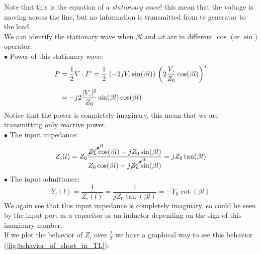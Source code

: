 Note that this is the equation of a \emph{stationary wave}! this mean that the voltage is moving across the line, but no information is transmitted from te generator to the load.\\
We can identify the stationary wave when $\beta l$ and $\omega t$ are in different $\cos$ (or $\sin$) operator.\\
$\bullet$ Power of this stationary wave:
\begin{align}
    \begin{split}
      P&=\frac{1}{2}V\cdot I^{*}=\frac{1}{2}\,\left(-2jV\bottomPlus \sin(\beta l)\right)\,\left(2\frac{V\bottomPlus}{Z_0}\cos(\beta l)\right)^*\\[5pt]
      &=-j2\frac{|V\bottomPlus|^2}{Z_0}\sin(\beta l)\cos(\beta l)
    \end{split}
\end{align}
Notice that the power is completely imaginary, this mean that we are transmitting only reactive power.\\
$\bullet$ The input impedance:
\begin{equation}\label{input_impedance_of_a_short}
    Z_i(l)=Z_0\frac{\cancelto{0}{Z_L}\cos(\beta l)+jZ_0 \sin(\beta l)}{Z_0\cos(\beta l)+j\cancelto{0}{Z_L}\sin(\beta l)}=jZ_0\tan(\beta l)
\end{equation}
$\bullet$ The input admittance:
\begin{equation}\label{input_admittance_of_an_open}
    Y_i(l)=\frac{1}{Z_i(l)}=\frac{1}{jZ_0\tan(\beta l)}=-Y_0\cot(\beta l)
\end{equation}
We again see that this input impedance is completely imaginary, so could be seen by the input port as a capacitor or an inductor depending on the sign of this imaginary number.\\
If we plot the behavior of $Z_i$ over $\frac{l}{\lambda}$ we have a graphical way to see this behavior (\cref{fig:behavior_of_short_in_TL}):
